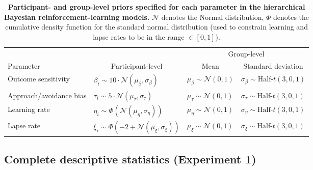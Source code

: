 \documentclass[a4paper,12pt]{article}
\begin{document}
\begin{refsection}[supp]
\begin{table}[h!]
    \centering
    \begin{tabular}{llll}
        \toprule
                  &                   & \multicolumn{2}{c}{Group-level} \\
        \cmidrule(lr){3-4}
        Parameter & \multicolumn{1}{c}{Participant-level} & \multicolumn{1}{c}{Mean} & \multicolumn{1}{c}{Standard deviation} \\
        \midrule
        Outcome sensitivity & $\beta_i \sim 10 \cdot \mathcal{N}(\mu_\beta, \sigma_\beta)$ & $\mu_\beta \sim \mathcal{N}(0,1)$ & $\sigma_\beta \sim \text{Half-}t(3,0,1)$ \\ 
        Approach/avoidance bias & $\tau_i \sim 5 \cdot \mathcal{N}(\mu_\tau, \sigma_\tau)$ & $\mu_\tau \sim \mathcal{N}(0,1)$ & $\sigma_\tau \sim \text{Half-}t(3,0,1)$ \\ 
        Learning rate & $\eta_i \sim \Phi \left(\mathcal{N}(\mu_\eta, \sigma_\eta)\right)$ & $\mu_\eta \sim \mathcal{N}(0,1)$ & $\sigma_\eta \sim \text{Half-}t(3,0,1)$ \\ 
        Lapse rate & $\xi_i \sim \Phi \left(-2 + \mathcal{N}(\mu_\xi, \sigma_\xi)\right)$ & $\mu_\xi \sim \mathcal{N}(0,1)$ & $\sigma_\xi \sim \text{Half-}t(3,0,1)$ \\ 
        \bottomrule
    \end{tabular}
    \caption{{\bf Participant- and group-level priors specified for each parameter in the hierarchical Bayesian reinforcement-learning models.} $\mathcal{N}$ denotes the Normal distribution, $\Phi$ denotes the cumulative density function for the standard normal distribution (used to constrain learning and lapse rates to be in the range $\in [0,1]$).}
    \label{tab:priors}
\end{table}

\clearpage
\subsection*{Complete descriptive statistics (Experiment 1)}


\end{refsection}
\end{document}
